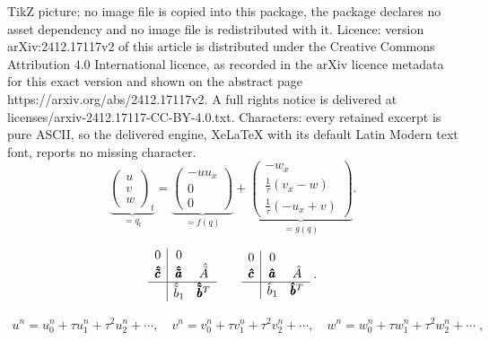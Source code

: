 \documentclass[10pt,a4paper]{amsart}
\newcommand{\tIIAex}{\hat{\tilde{A}}}
\newcommand{\tIIAim}{\hat{A}}
\newcommand{\tIIaex}{\pmb{\hat{\tilde{a}}}}
\newcommand{\tIIaim}{\pmb{\hat{a}}}
\newcommand{\tIIbexf}{\hat{\tilde{b}}_1}
\newcommand{\tIIbex}{\pmb{\hat{\tilde{b}}}}
\newcommand{\tIIbimf}{\hat{b}_1}
\newcommand{\tIIbim}{\pmb{\hat{b}}}
\newcommand{\tIIcex}{\pmb{\hat{\tilde{c}}}}
\newcommand{\tIIcim}{\pmb{\hat{c}}}
\begin{document}
TikZ picture; no image file is copied into this package, the package declares no asset dependency and no image file is redistributed with it. Licence: version arXiv:2412.17117v2 of this article is distributed under the Creative Commons Attribution 4.0 International licence, as recorded in the arXiv licence metadata for this exact version and shown on the abstract page https://arxiv.org/abs/2412.17117v2. A full rights notice is delivered at licenses/arxiv-2412.17117-CC-BY-4.0.txt. Characters: every retained excerpt is pure ASCII, so the delivered engine, XeLaTeX with its default Latin Modern text font, reports no missing character.
\begin{equation}\label{Eq:KdVH_AP_split}
    \underbrace{\begin{pmatrix}
        u \\
        v \\
        w
    \end{pmatrix}_{t}}_{= q_t}
    =
    \underbrace{\begin{pmatrix}
        -u u_x \\
        0 \\
        0
    \end{pmatrix}}_{= f(q)}
    +
    \underbrace{\begin{pmatrix}
        -w_x \\
        \frac{1}{\tau} (v_x - w) \\
        \frac{1}{\tau} (-u_x + v)
    \end{pmatrix}}_{= g(q)}.
\end{equation}

\begin{equation}\label{Mthd:CK_SA_ARK}
\begin{array}{c|ccc}
    0 & 0 \\
    \tIIcex & \tIIaex & \tIIAex\\
    \hline
    & \tIIbexf & \tIIbex^T
\end{array}
\qquad
\begin{array}{c|ccc}
    0 & 0 \\
    \tIIcim & \tIIaim & \tIIAim \\
    \hline
    & \tIIbimf & \tIIbim^T
\end{array} \;.
\end{equation}

\begin{align} \label{hilbert}
u^n = u^n_0 + \tau u^n_1 + \tau^2 u^n_2 + \cdots, \quad v^n  = v^n_0 + \tau v^n_1 + \tau^2 v^n_2 + \cdots, \quad w^n = w^n_0 + \tau w^n_1 + \tau^2 w^n_2 + \cdots \;,
\end{align}
\end{document}
